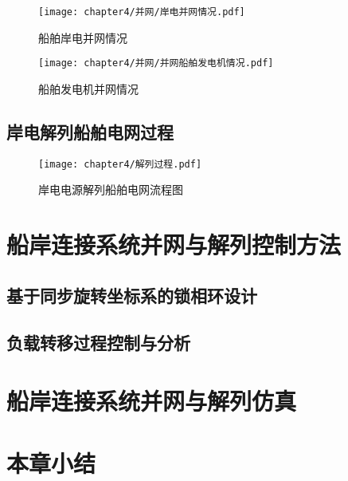 \begin{figure}[!htp]
	\centering
	\texttt{[image: chapter4/并网/岸电并网情况.pdf]}
	\caption{船舶岸电并网情况}
	\label{fig:船舶岸电并网情况}
\end{figure}

\begin{figure}[!htp]
	\centering
	\texttt{[image: chapter4/并网/并网船舶发电机情况.pdf]}
	\caption{船舶发电机并网情况}
	\label{fig:船舶发电机并网情况}
\end{figure}


\subsection{岸电解列船舶电网过程}

\begin{figure}[!htp]
	\centering
	\texttt{[image: chapter4/解列过程.pdf]}
	\caption{岸电电源解列船舶电网流程图}
	\label{fig:岸电电源解列船舶电网流程图}
\end{figure}

\section{船岸连接系统并网与解列控制方法}

\subsection{基于同步旋转坐标系的锁相环设计}

\subsection{负载转移过程控制与分析}

\begin{table}[!htp]
	\centering
	\caption[电压和频率波动表]{电压和频率波动表\cite{SP7}}
	\label{tab:电压和频率波动表}
\end{table}

\section{船岸连接系统并网与解列仿真}




\section{本章小结}




